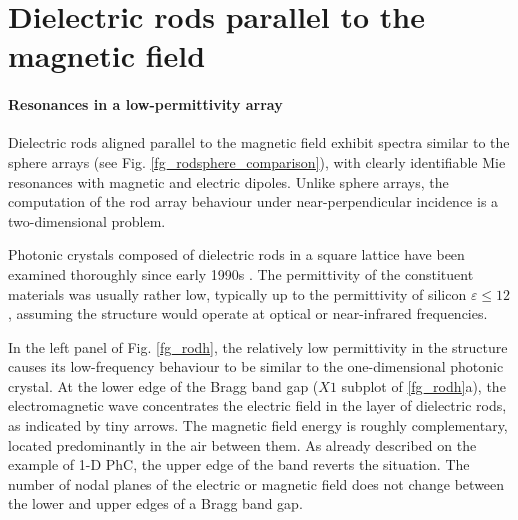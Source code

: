 %   


\FloatBarrier %
\section{Dielectric rods parallel to the magnetic field} %
\paragraph{Resonances in a low-permittivity array}	\label{sect_diel_rods_mag}	%
Dielectric rods aligned parallel to the magnetic field exhibit spectra similar to the sphere arrays (see Fig. \ref{fg_rodsphere_comparison}), with clearly identifiable Mie resonances with magnetic and electric dipoles.
Unlike sphere arrays, the computation of the rod array behaviour under near-perpendicular incidence is a two-dimensional problem. 

Photonic crystals composed of dielectric rods in a square lattice have been examined thoroughly since early 1990s \cite{plihal1991two, pendry1992_transfer_matrix}. The permittivity of the constituent materials was usually rather low, typically up to the permittivity of silicon $\varepsilon \leq 12$, assuming the structure would operate at optical or near-infrared frequencies. 

In the left panel of Fig. \ref{fg_rodh}, the relatively low permittivity in the structure causes its low-frequency behaviour to be similar to the one-dimensional photonic crystal. At the lower edge of the Bragg band gap ($X1$ subplot of \ref{fg_rodh}a), the electromagnetic wave concentrates the electric field in the layer of dielectric rods, as indicated by tiny arrows. The magnetic field energy is roughly complementary, located predominantly in the air between them. As already described on the example of 1-D PhC, the upper edge of the band reverts the situation. The number of nodal planes of the electric or magnetic field does not change between the lower and upper edges of a Bragg band gap.

